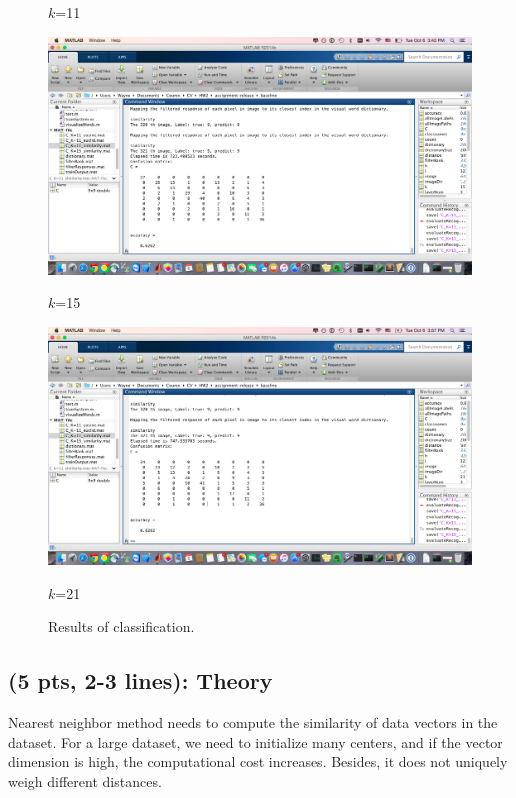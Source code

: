 \documentclass[12pt]{article}
\begin{document}
\begin{figure}[htbp!]
\begin{minipage}[t]{0.45 \textwidth}
		\caption*{$k$=11}
	\end{minipage}
	\begin{minipage}[t]{0.45 \textwidth}
		\centering \includegraphics[width= \linewidth]{./figures/k=15_similarity} 
		\caption*{$k$=15}
	\end{minipage}
	\begin{minipage}[t]{0.45 \textwidth}
		\centering \includegraphics[width= \linewidth]{./figures/k=21_similarity} 
		\caption*{$k$=21}
	\end{minipage}
\caption{Results of classification.}
\label{fig:result_classification}
\end{figure}

\subsection{(5 pts, 2-3 lines): Theory}

Nearest neighbor method needs to compute the similarity of data vectors in the dataset. For a large dataset, we need to initialize many centers, and if the vector dimension is high, the computational cost increases. Besides, it does not uniquely weigh different distances.
\end{document}
